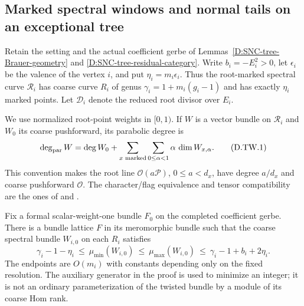 \subsection{Marked spectral windows and normal tails on an exceptional tree}

Retain the setting and the actual coefficient gerbe of
Lemmas~\ref{D:SNC-tree-Brauer-geometry} and
\ref{D:SNC-tree-residual-category}. Write
$b_i=-E_i^2>0$, let $\epsilon_i$ be the valence of the
vertex $i$, and put $\eta_i=m_i\epsilon_i$. Thus the
root-marked spectral curve $\mathcal R_i$ has coarse curve
$R_i$ of genus $\gamma_i=1+m_i(g_i-1)$ and has exactly
$\eta_i$ marked points. Let $\mathcal D_i$ denote the
reduced root divisor over $E_i$.

We use normalized root-point weights in $[0,1)$. If $W$
is a vector bundle on $\mathcal R_i$ and $W_0$ its coarse
pushforward, its parabolic degree is
\[
 \deg_{\rm par}W=\deg W_0+
       \sum_{x\text{ marked}}\sum_{0\leq\alpha<1}
                              \alpha\,\dim W_{x,\alpha}.
                                                        \tag{D.TW.1}
\]
This convention makes the root line $\mathcal O(a\mathcal P)$,
$0\leq a<d_x$, have degree $a/d_x$ and coarse pushforward
$\mathcal O$. The character/flag equivalence and tensor
compatibility are the ones of
\citet[Proposition3 and Theorem4, complete proofs]
{Borne2007D} and \citet[Theorem6.1]{BorneVistoli2012D}.

\begin{lemma}
\label{D:SNC-tree-minimal-marked-windows}
Fix a formal scalar-weight-one bundle $F_0$ on the completed
coefficient gerbe. There is a bundle lattice $F$ in its
meromorphic bundle such that the coarse spectral bundle
$W_{i,0}$ on each $R_i$ satisfies
\[
 \gamma_i-1-\eta_i\ \leq\ \mu_{\min}(W_{i,0})
 \ \leq\ \mu_{\max}(W_{i,0})
 \ \leq\ \gamma_i-1+b_i+2\eta_i.                       \tag{D.TW.2}
\]
The endpoints are $O(m_i)$ with constants depending only
on the fixed resolution. The auxiliary generator in the
proof is used to minimize an integer; it is not an ordinary
parameterization of the twisted bundle by a module of its
coarse Hom rank.
\end{lemma}

